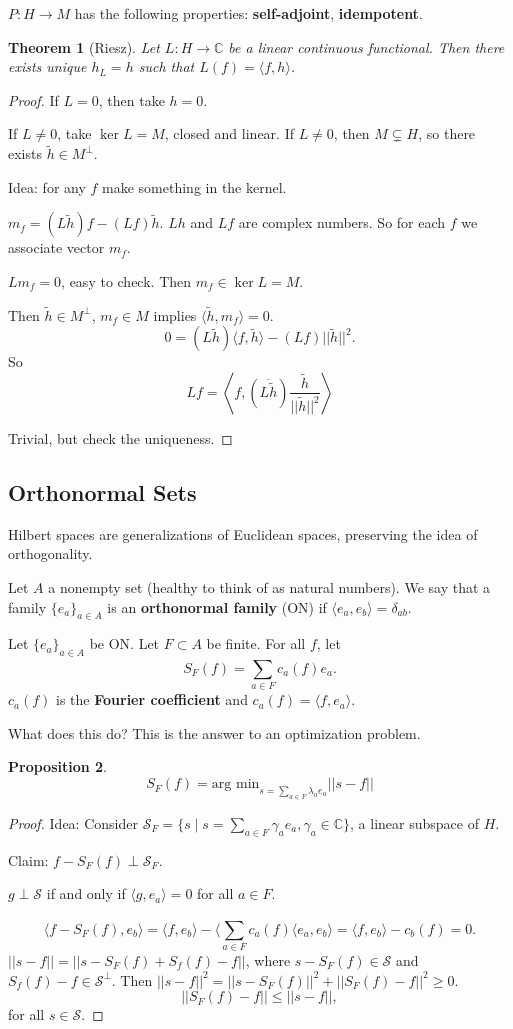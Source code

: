 \documentclass[11pt]{article}
\newtheorem{thm}{Theorem}[section]
\newtheorem{prop}[thm]{Proposition}
\newenvironment{defn}[1][Definition]{\begin{trivlist}
\item[\hskip \labelsep {\bfseries #1}]}{\end{trivlist}}
\newcommand{\ca}[1]{\mathcal{#1}}
\newcommand{\mb}[1]{\mbox{#1}}
\newcommand{\ov}[1]{\overline{#1}}
\newcommand{\ra}{\rightarrow}
\newcommand{\sbs}{\subset}
\newcommand{\lan}{\langle}
\newcommand{\ran}{\rangle}
\newcommand{\ga}{\gamma}
\newcommand{\de}{\delta}
\newcommand{\la}{\lambda}
\newcommand{\su}[2]{\sum_{#1}^{#2}}
\newcommand{\fr}[2]{\frac{#1}{#2}}
\newcommand{\co}{\mathbb{C}}
\begin{document}
$P:H\ra M$ has the following properties: {\bf self-adjoint}, {\bf idempotent}. 

\begin{thm}[Riesz]
Let $L:H\ra\co$ be a linear continuous functional. Then there exists unique $h_L=h$ such that $L(f)=\lan f,h\ran$. 
\end{thm}
\begin{proof}
If $L=0$, then take $h=0$. 

If $L\neq 0$, take $\ker L=M$, closed and linear. If $L\neq 0$, then $M\subsetneq H$, so there exists $\tilde h\in M^{\perp}$. 

Idea: for any $f$ make something in the kernel.

$m_f=(L\tilde h)f-(Lf)\tilde h$. $Lh$ and $Lf$ are complex numbers. So for each $f$ we associate vector $m_f$. 

$Lm_f=0$, easy to check. Then $m_f\in\ker L=M$. 

Then $\tilde h\in M^{\perp}$, $m_f\in M$ implies $\lan \tilde h,m_f\ran=0$. 
\[0=(L\tilde h)\lan f,\tilde h\ran-(Lf)||\tilde h||^2.\] 
So \[Lf=\left\lan f, (\ov{L\tilde h})\fr{\tilde h}{||\tilde h||^2}\right\ran\]

Trivial, but check the uniqueness. 

\end{proof}

\subsection{Orthonormal Sets}

Hilbert spaces are generalizations of Euclidean spaces, preserving the idea of orthogonality. 

\begin{defn}
Let $A$ a nonempty set (healthy to think of as natural numbers). We say that a family $\{e_a\}_{a\in A}$ is an {\bf orthonormal family} (ON) if $\lan e_a,e_b\ran=\de_{ab}$. 
\end{defn}
Let $\{e_a\}_{a\in A}$ be ON. Let $F\sbs A$ be finite. For all $f$, let \[S_F(f)=\su{a\in F}{}c_a(f)e_a.\]
$c_a(f)$ is the {\bf Fourier coefficient} and $c_a(f)=\lan f,e_a\ran$. 

What does this do? This is the answer to an optimization problem.

\begin{prop}
\[S_F(f)=\mb{arg min}_{s=\su{a\in F}{}\la_ae_a}||s-f||\]
\end{prop}
\begin{proof}
Idea: Consider $\ca S_F=\{s\mid s=\su{a\in F}{}\ga_ae_a, \ga_a\in\co\}$, a linear subspace of $H$. 

Claim: $f-S_F(f)\perp\ca S_F$. 

$g\perp \ca S$ if and only if $\lan g,e_a\ran=0$ for all $a\in F$. 

\[\lan f-S_F(f),e_b\ran=\lan f,e_b\ran-\lan\su{a\in F}{}c_a(f)\lan e_a,e_b\ran=\lan f,e_b\ran-c_b(f)=0.\]
$||s-f||=||s-S_F(f)+S_f(f)-f||$, where $s-S_F(f)\in \ca S$ and $S_f(f)-f\in\ca S^{\perp}$. Then $||s-f||^2=||s-S_F(f)||^2+||S_F(f)-f||^2\ge 0$. 
\[||S_F(f)-f||\le ||s-f||,\]
for all $s\in\ca S$.
\end{proof}
\end{document}
